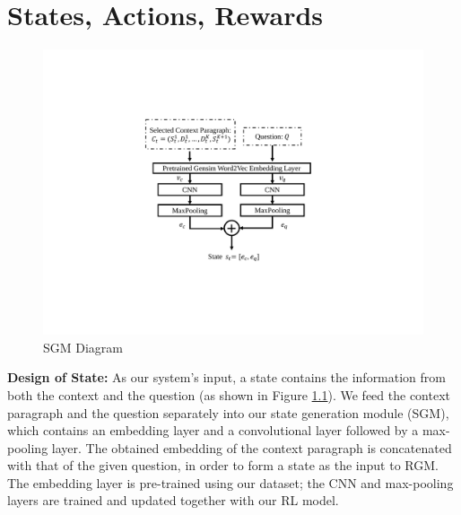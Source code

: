 \chapter{States, Actions, Rewards}\label{sec:design}

\begin{figure}\centering
\begin{minipage}{.45\textwidth}
 \includegraphics[width=0.9\linewidth]{Images/fig1_2.pdf}
 \caption{SGM Diagram}
 \label{fig:sgmDiagram}
\end{minipage}
\vspace{-2ex}
\end{figure}

\textbf{Design of State:} As our system's input, a state contains the information from both the context and the question (as shown in Figure \ref{fig:sgmDiagram}). %
We feed the context paragraph and the question separately into our state generation module (SGM), which contains an embedding layer and a convolutional layer followed by a max-pooling layer. The obtained embedding of the context paragraph is concatenated with that of the given question, in order to form a state as the input to RGM. The embedding layer is pre-trained using our dataset; the CNN and max-pooling layers are trained and updated together with our RL model. %
 
